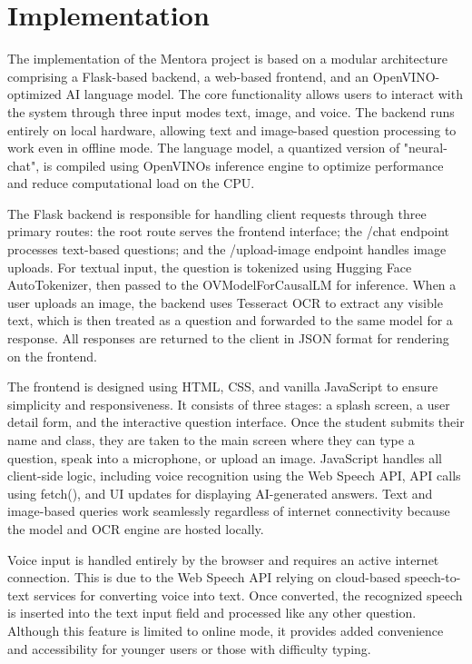 \documentclass{josis}
\begin{document}
 
\begin{description}



\end{description} 
\section{Implementation}
The implementation of the Mentora project is based on a modular architecture comprising a Flask-based backend, a web-based frontend, and an OpenVINO-optimized AI language model. The core functionality allows users to interact with the system through three input modes text, image, and voice. The backend runs entirely on local hardware, allowing text and image-based question processing to work even in offline mode. The language model, a quantized version of "neural-chat", is compiled using OpenVINOs inference engine to optimize performance and reduce computational load on the CPU.



The Flask backend is responsible for handling client requests through three primary routes: the root route serves the frontend interface; the /chat endpoint processes text-based questions; and the /upload-image endpoint handles image uploads. For textual input, the question is tokenized using Hugging Face  AutoTokenizer, then passed to the OVModelForCausalLM for inference. When a user uploads an image, the backend uses Tesseract OCR to extract any visible text, which is then treated as a question and forwarded to the same model for a response. All responses are returned to the client in JSON format for rendering on the frontend.





The frontend is designed using HTML, CSS, and vanilla JavaScript to ensure simplicity and responsiveness. It consists of three stages: a splash screen, a user detail form, and the interactive question interface. Once the student submits their name and class, they are taken to the main screen where they can type a question, speak into a microphone, or upload an image. JavaScript handles all client-side logic, including voice recognition using the Web Speech API, API calls using fetch(), and UI updates for displaying AI-generated answers. Text and image-based queries work seamlessly regardless of internet connectivity because the model and OCR engine are hosted locally.



Voice input is handled entirely by the browser and requires an active internet connection. This is due to the Web Speech API relying on cloud-based speech-to-text services for converting voice into text. Once converted, the recognized speech is inserted into the text input field and processed like any other question. Although this feature is limited to online mode, it provides added convenience and accessibility for younger users or those with difficulty typing.
\end{document}
